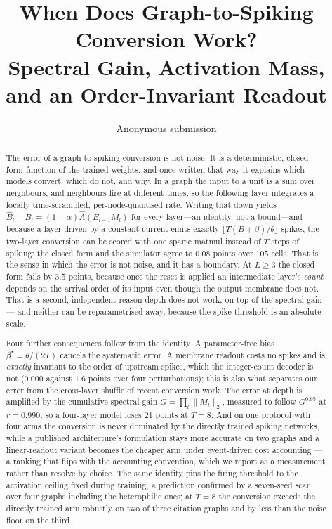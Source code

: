 \documentclass[10pt,twocolumn]{article}
\title{\vspace{-1.2em}\bfseries When Does Graph-to-Spiking Conversion Work?\\
Spectral Gain, Activation Mass, and an Order-Invariant Readout}
\author{Anonymous submission}
\date{}
\newcommand{\Ahat}{\hat{A}}
\newcommand{\betastar}{\beta^{\star}}
\begin{document}
\maketitle
\vspace{-1.5em}

\begin{abstract}
The error of a graph-to-spiking conversion is not noise. It is a deterministic, closed-form function
of the trained weights, and once written that way it explains which models convert, which do not, and
why. In a graph the input to a unit is a sum over neighbours, and neighbours fire at different times,
so the following layer integrates a locally time-scrambled, per-node-quantised rate. Writing that
down yields $\hat{B}_{l}-B_{l}=(1-\alpha)\Ahat(E_{l-1}M_{l})$ for every layer---an identity, not a
bound---and because a layer driven by a constant current emits exactly
$\lfloor T(B+\beta)/\theta\rfloor$ spikes, the two-layer conversion can be scored with one sparse
matmul instead of $T$ steps of spiking: the closed form and the simulator agree to $0.08$ points over
$105$ cells. That is the sense in which the error is not noise, and it has a boundary. At $L\ge3$ the
closed form fails by $3.5$ points, because once the reset is applied an intermediate layer's
\emph{count} depends on the arrival order of its input even though the output membrane does not. That is
a second, independent reason depth does not work, on top of the spectral gain --- and neither can be
reparametrised away, because the spike threshold is an absolute scale.

Four further consequences follow from the identity. A parameter-free bias $\betastar=\theta/(2T)$
cancels the systematic error. A membrane readout costs no spikes and is \emph{exactly} invariant to
the order of upstream spikes, which the integer-count decoder is not ($0.000$ against $1.6$ points
over four perturbations); this is also what separates our error from the cross-layer shuffle of recent
conversion work. The error at depth is amplified by the cumulative spectral gain
$G=\prod_{l}\lVert M_{l}\rVert_{2}$, measured to follow $G^{0.95}$ at $r=0.990$, so a four-layer
model loses $21$ points at $T=8$. And on one protocol with four arms the conversion is never
dominated by the directly trained spiking networks, while a published architecture's formulation
stays more accurate on two graphs and a linear-readout variant becomes the cheaper arm under
event-driven cost accounting --- a ranking that flips with the accounting convention, which we
report as a measurement rather than resolve by choice. The
same identity pins the firing threshold to the activation ceiling fixed during training, a
prediction confirmed by a seven-seed scan over four graphs including the heterophilic ones; at
$T=8$ the conversion exceeds the directly trained arm robustly on two of three citation graphs and
by less than the noise floor on the third.


\end{abstract}
\end{document}
